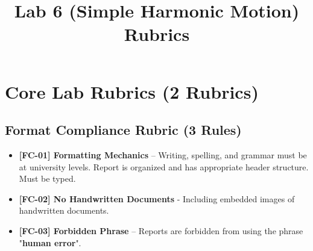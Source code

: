 \documentclass{article}
\begin{document}
\pagestyle{empty}

\title{Lab 6 (Simple Harmonic Motion) Rubrics}

\section*{Core Lab Rubrics (2 Rubrics)}

\subsection*{Format Compliance Rubric (3 Rules)}
\begin{itemize}
\item \textbf{ [FC-01] Formatting Mechanics } – Writing, spelling, and grammar must be at university levels. Report is organized and has appropriate header structure. Must be typed.
\item \textbf{ [FC-02] No Handwritten Documents } - Including embedded images of handwritten documents.
\item \textbf{ [FC-03] Forbidden Phrase } – Reports are forbidden from using the phrase "\textbf{human error}". 
\end{itemize}
\end{document}
